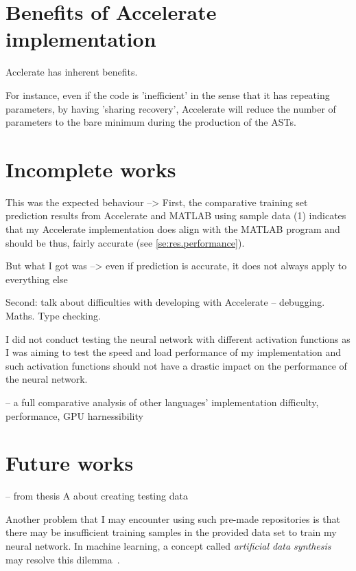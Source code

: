 \section{Benefits of Accelerate implementation} \label{se:impl.benefits}

Acclerate has inherent benefits.

For instance, even if the code is 'inefficient' in the sense that it has repeating parameters, by having 'sharing recovery', Accelerate will reduce the number of parameters to the bare minimum during the production of the ASTs.

\section{Incomplete works} \label{se:eval.incomplete}

This was the expected behaviour --> First, the comparative training set prediction results from Accelerate and MATLAB using sample data (1) indicates that my Accelerate implementation does align with the MATLAB program and should be thus, fairly accurate (see \ref{se:res.performance}).

But what I got was --> even if prediction is accurate, it does not always apply to everything else

Second: talk about difficulties with developing with Accelerate -- debugging. Maths. Type checking.

I did not conduct testing the neural network with different activation functions as I was aiming to test the speed and load performance of my implementation and such activation functions should not have a drastic impact on the performance of the neural network.

-- a full comparative analysis of other languages' implementation difficulty, performance, GPU harnessibility

\section{Future works} \label{se:eval.future}



-- from thesis A about creating testing data

Another problem that I may encounter using such pre-made repositories is that there may be insufficient training samples in the provided data set to train my neural network. In machine learning, a concept called \textit{artificial data synthesis} may resolve this dilemma~\cite{Ng12}. 

